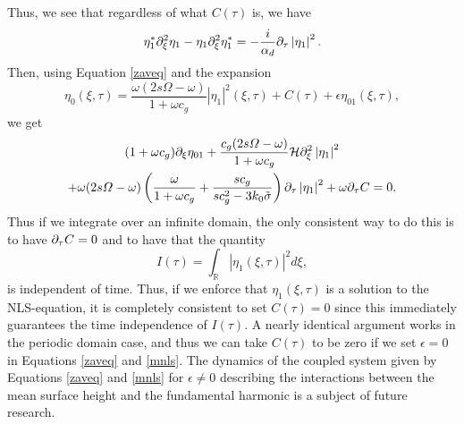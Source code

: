 \documentclass{JFM_Style/jfm}
\begin{document}
Thus, we see that regardless of what $C(\tau)$ is, we have   
\[
\eta_{1}^{\ast}\partial_{\xi}^{2}\eta_{1}-\eta_{1}\partial_{\xi}^{2}\eta_{1}^{\ast} = -\frac{i}{\alpha_{d}}\partial_{\tau}\left|\eta_{1}\right|^{2}.
\]
Then, using Equation \eqref{zaveq} and the expansion
\[
\eta_{0}(\xi,\tau) = \frac{\omega(2s\Omega-\omega)}{1+\omega c_{g}}\left|\eta_{1}\right|^{2}(\xi,\tau) + C(\tau) + \epsilon \eta_{01}(\xi,\tau),
\]
we get
\begin{multline*}
(1+\omega c_{g})\partial_{\xi}\eta_{01}+ \frac{c_{g}(2s\varOmega-\omega)}{1+\omega c_{g}}\mathcal{H}\partial_{\xi}^{2}\left|\eta_{1}\right|^{2} \\
+ \omega(2s\varOmega-\omega)\left(\frac{\omega}{1+\omega c_{g}} + \frac{sc_{g}}{sc_{g}^{2}-3k_{0}\tilde{\sigma}}\right)\partial_{\tau}\left|\eta_{1}\right|^{2} + \omega \partial_{\tau}C = 0.
\end{multline*}
Thus if we integrate over an infinite domain, the only consistent way to do this is to have $\partial_{\tau}C=0$ and to have that the quantity
\[
I(\tau) = \int_{\mathbb{R}} \left|\eta_{1}(\xi,\tau)\right|^{2} d\xi ,
\]
is independent of time.  Thus, if we enforce that $\eta_{1}(\xi,\tau)$ is a solution to the NLS-equation, it is completely consistent to set $C(\tau)=0$ since this immediately guarantees the time independence of $I(\tau)$.  A nearly identical argument works in the periodic domain case, and thus we can take $C(\tau)$ to be zero if we set $\epsilon=0$ in Equations \eqref{zaveq} and \eqref{mnls}.  The dynamics of the coupled system given by Equations \eqref{zaveq} and \eqref{mnls} for $\epsilon\neq 0$ describing the interactions between the mean surface height and the fundamental harmonic is a subject of future research.  
\end{document}
